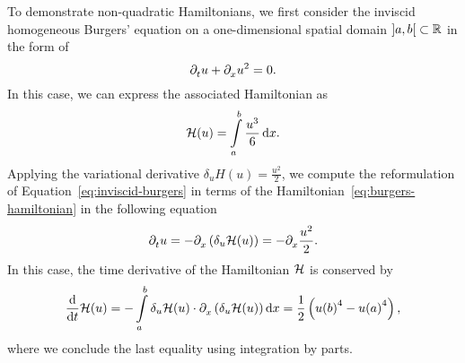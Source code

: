 \begin{example}\label{ex:inviscid-burgers}
    To demonstrate non-quadratic Hamiltonians, we first consider the inviscid homogeneous Burgers' equation on a one-dimensional spatial domain $\interval[open]{a}{b} \subset \bb{R}$ in the form of
    \begin{equation}\label{eq:inviscid-burgers}
        \pd[t]{} u + \pd[x]{} u^2 = 0.
    \end{equation}
    In this case, we can express the associated Hamiltonian as
    \begin{equation}\label{eq:burgers-hamiltonian}
        \mcl{H}(u) = \int\limits_a^b \frac{u^3}{6} \dif x.
    \end{equation}
    Applying the variational derivative $\delta_u H(u) = \frac{u^2}{2}$, we compute the reformulation of Equation~\eqref{eq:inviscid-burgers} in terms of the Hamiltonian~\eqref{eq:burgers-hamiltonian} in the following equation
    \begin{equation*}
        \pd[t]{} u = - \pd{} \left( \delta_u \mcl{H}(u) \right) = -\pd{} \frac{u^2}{2}.
    \end{equation*}
    In this case, the time derivative of the Hamiltonian $\mcl{H}$ is conserved by
    \begin{equation*}
        \frac{\dif}{\dif t} \mcl{H}(u) = - \int\limits_a^b \delta_u \mcl{H}(u) \cdot \pd{} \left( \delta_u \mcl{H}(u) \right) \dif x = \frac{1}{2} \left( {u(b)}^4 - {u(a)}^4 \right),
    \end{equation*}
    where we conclude the last equality using integration by parts.
\end{example}
